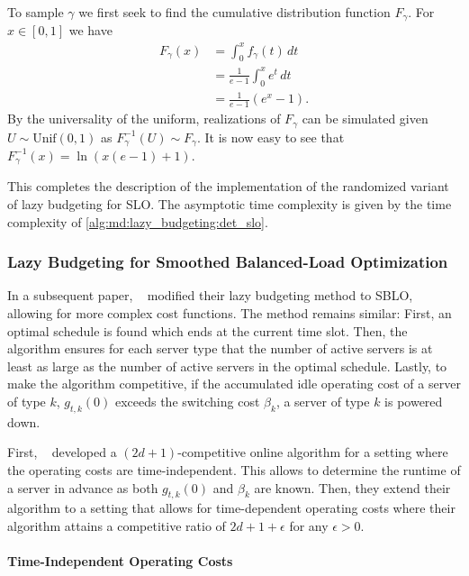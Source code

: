 To sample $\gamma$ we first seek to find the cumulative distribution function $F_{\gamma}$. For $x \in [0,1]$ we have \begin{align*}
    F_{\gamma}(x) &= \int_0^x f_{\gamma}(t) \,dt \\
                  &= \frac{1}{e-1} \int_0^x e^t \,dt \\
                  &= \frac{1}{e-1} (e^x - 1).
\end{align*} By the universality of the uniform, realizations of $F_{\gamma}$ can be simulated given $U \sim \text{Unif}(0,1)$ as $F_{\gamma}^{-1}(U) \sim F_{\gamma}$. It is now easy to see that $F_{\gamma}^{-1}(x) = \ln (x (e - 1) + 1)$.

This completes the description of the implementation of the randomized variant of lazy budgeting for SLO. The asymptotic time complexity is given by the time complexity of \cref{alg:md:lazy_budgeting:det_slo}.

\subsubsection{Lazy Budgeting for Smoothed Balanced-Load Optimization}

In a subsequent paper, \citeauthor*{Albers2021_2}~\cite{Albers2021_2} modified their lazy budgeting method to SBLO, allowing for more complex cost functions. The method remains similar: First, an optimal schedule is found which ends at the current time slot. Then, the algorithm ensures for each server type that the number of active servers is at least as large as the number of active servers in the optimal schedule. Lastly, to make the algorithm competitive, if the accumulated idle operating cost of a server of type $k$, $g_{t,k}(0)$ exceeds the switching cost $\beta_k$, a server of type $k$ is powered down.

First, \citeauthor*{Albers2021_2}~\cite{Albers2021_2} developed a $(2d+1)$-competitive online algorithm for a setting where the operating costs are time-independent. This allows to determine the runtime of a server in advance as both $g_{t,k}(0)$ and $\beta_k$ are known. Then, they extend their algorithm to a setting that allows for time-dependent operating costs where their algorithm attains a competitive ratio of $2d+1+\epsilon$ for any $\epsilon > 0$.

\paragraph{Time-Independent Operating Costs}


